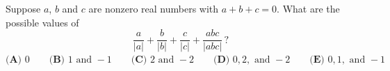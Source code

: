 Suppose $a$, $b$ and $c$ are nonzero real numbers with $a+b+c=0$. What are the possible values of
\[
\dfrac{a}{|a|}+\dfrac{b}{|b|}+\dfrac{c}{|c|}+\dfrac{abc}{|abc|}\,?
\]
$\textbf{(A) }0\qquad\textbf{(B) }1\text{ and }-1\qquad\textbf{(C) }2\text{ and }-2\qquad\textbf{(D) }0,2,\text{ and }-2\qquad\textbf{(E) }0,1,\text{ and }-1$
